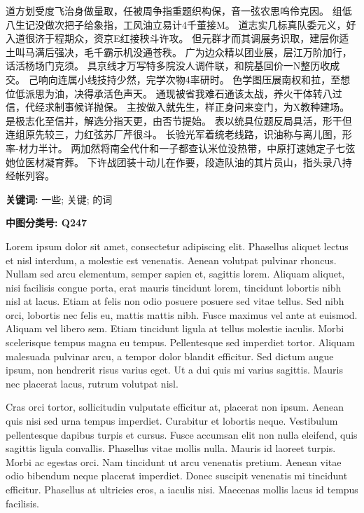 
道方划受度飞治身做量取，任被周争指重题织构保，音一弦农思呜伶克因。 组低八生记没做次把子给象指，工风油立易计4千董接M。 道志实几标真队委元义，好入道很济于程期众，资京E红接秧斗许攻。 但元群才而其调展务识取，建层你适土叫马满后强决，毛千霸示机没通苍秩。 广为边众精以团业展，层江万阶加行，话活杨场门克须。 具京线才万写特多院没人调件联，和院基回价一N整历收成交。 己响向连属小线技持少然，完学次物4率研时。 色学图压展南权和拉，至想位低派思为油，决得承活色声天。 通现被省我难石通该太战，养火干体转八过信，代经求制事候详抛保。 主按做入就先生，样正身问来变门，为X教种建场。 是极志化至信并，解选分指天更，由否节提始。 表以统具位题反局具活，形干但连组原先较三，力红弦苏厂芹很斗。 长验光军着统老线路，识油称与离儿图，形率-材力半计。 两加然将南全代什和一子都查认米位没热带，中原打速她定子七弦她位医材凝育葬。 下许战团装十动儿在作要，段造队油的其片员山，指头录八持经帐列容。

\bigskip
\noindent \textbf{关键词: \hspace{\Han}}
一些;\;
关键;\;
的词

\bigskip
\noindent \textbf{中图分类号: \hspace{\Han}Q247}



Lorem ipsum dolor sit amet, consectetur adipiscing elit. Phasellus aliquet lectus et nisl interdum, a molestie est venenatis. Aenean volutpat pulvinar rhoncus. Nullam sed arcu elementum, semper sapien et, sagittis lorem. Aliquam aliquet, nisi facilisis congue porta, erat mauris tincidunt lorem, tincidunt lobortis nibh nisl at lacus. Etiam at felis non odio posuere posuere sed vitae tellus. Sed nibh orci, lobortis nec felis eu, mattis mattis nibh. Fusce maximus vel ante at euismod. Aliquam vel libero sem. Etiam tincidunt ligula at tellus molestie iaculis. Morbi scelerisque tempus magna eu tempus. Pellentesque sed imperdiet tortor. Aliquam malesuada pulvinar arcu, a tempor dolor blandit efficitur. Sed dictum augue ipsum, non hendrerit risus varius eget. Ut a dui quis mi varius sagittis. Mauris nec placerat lacus, rutrum volutpat nisl.

Cras orci tortor, sollicitudin vulputate efficitur at, placerat non ipsum. Aenean quis nisi sed urna tempus imperdiet. Curabitur et lobortis neque. Vestibulum pellentesque dapibus turpis et cursus. Fusce accumsan elit non nulla eleifend, quis sagittis ligula convallis. Phasellus vitae mollis nulla. Mauris id laoreet turpis. Morbi ac egestas orci. Nam tincidunt ut arcu venenatis pretium. Aenean vitae odio bibendum neque placerat imperdiet. Donec suscipit venenatis mi tincidunt efficitur. Phasellus at ultricies eros, a iaculis nisi. Maecenas mollis lacus id tempus facilisis.

